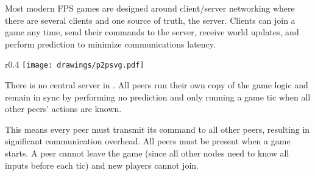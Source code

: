 Most modern FPS games are designed around client/server networking where there are several clients and one source of truth, the server. Clients can join a game any time, send their commands to the server, receive world updates, and perform prediction to minimize communications latency.\\
\par
\begin{wrapfigure}[12]{r}{0.4\textwidth}
\centering
\texttt{[image: drawings/p2psvg.pdf]}
\end{wrapfigure}
There is no central server in \doom. All peers run their own copy of the game logic and remain in sync by performing no prediction and only running a game tic when all other peers' actions are known.\\
\par
 This means every peer must transmit its command to all other peers, resulting in significant communication overhead. 
All peers must be present when a game starts. A peer cannot leave the game (since all other nodes need to know all inputs before each tic) and new players cannot join.
\pagebreak





